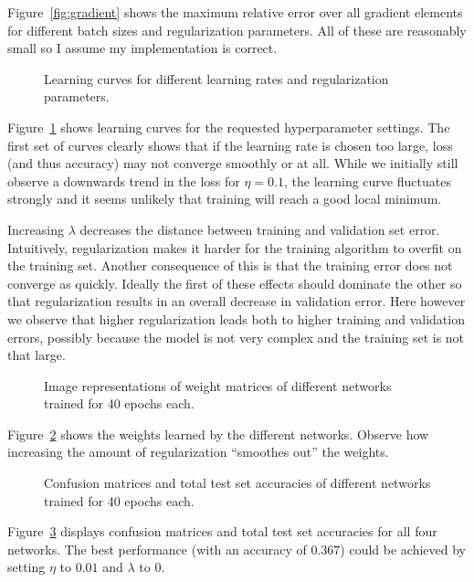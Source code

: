 \documentclass{article}
\begin{document}
\noindent
Figure~\ref{fig:gradient} shows the maximum relative error over all gradient
elements for different batch sizes and regularization parameters. All of these
are reasonably small so I assume my implementation is correct.

\bigskip

\begin{figure}
  \centering
    
  \caption{Learning curves for different learning rates and regularization
           parameters.}
  \label{fig:learning_curves}
\end{figure}

\noindent
Figure~\ref{fig:learning_curves} shows learning curves for the requested
hyperparameter settings. The first set of curves clearly shows that if the
learning rate is chosen too large, loss (and thus accuracy) may not converge
smoothly or at all. While we initially still observe a downwards trend in the
loss for $\eta = 0.1$, the learning curve fluctuates strongly and it seems
unlikely that training will reach a good local minimum.

Increasing $\lambda$ decreases the distance between training and validation set
error. Intuitively, regularization makes it harder for the training algorithm
to overfit on the training set. Another consequence of this is that the
training error does not converge as quickly. Ideally the first of these effects
should dominate the other so that regularization results in an overall decrease
in validation error. Here however we observe that higher regularization leads
both to higher training and validation errors, possibly because the model is
not very complex and the training set is not that large.

\begin{figure}[H]
  \centering
    
  \caption{Image representations of weight matrices of different networks
           trained for 40 epochs each.}
  \label{fig:weights}
\end{figure}

\noindent
Figure~\ref{fig:weights} shows the weights learned by the different networks.
Observe how increasing the amount of regularization ``smoothes out'' the weights.

\begin{figure}[H]
  \centering
    
  \caption{Confusion matrices and total test set accuracies of different
           networks trained for 40 epochs each.}
  \label{fig:confusion_matrices}
\end{figure}

\noindent
Figure~\ref{fig:confusion_matrices} displays confusion matrices and total
test set accuracies for all four networks. The best performance (with an
accuracy of $0.367$) could be achieved by setting $\eta$ to $0.01$ and
$\lambda$ to 0.
\end{document}
